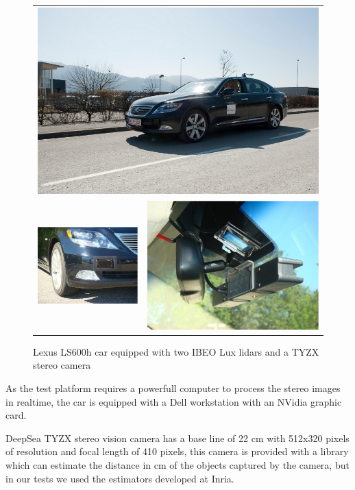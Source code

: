 \begin{figure}[h]
   \centering
     \begin{tabular}{lr}
     \multicolumn{2}{c}{ \includegraphics[width=0.55\columnwidth]{img/testbed:car}}\\
       \includegraphics[width=0.40\columnwidth]{img/testbed:ibeo}
       &\includegraphics[width=0.40\columnwidth]{img/testbed:tyzx}
     \end{tabular}
   \caption{Lexus LS600h car equipped with two IBEO Lux lidars and a TYZX
     stereo camera}
   \label{fig:Lexus}
 \end{figure}

As the test platform requires a powerfull computer to process the stereo images in realtime, the car is equipped with a Dell workstation with an NVidia graphic card.

DeepSea TYZX stereo vision camera has a base line of 22 cm with 512x320 pixels of resolution and focal length of 410 pixels, this camera is provided with a library which can estimate the distance in cm of the objects captured by the camera, but in our tests we used the estimators developed at Inria\cite{PERROLLAZ-2010-493397}.

